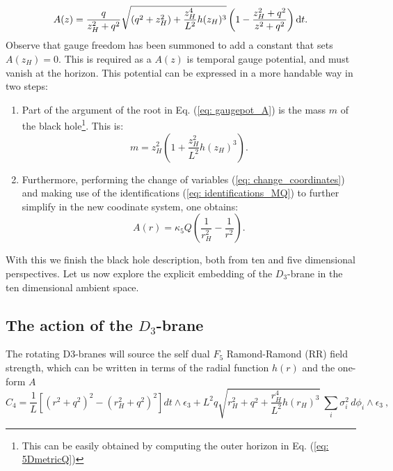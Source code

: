 \begin{equation}\label{eq: gaugepot_A}
 A(z) = \frac{q}{z_H^2+q^2}\sqrt{ \left(q^2+z_H^2 \right) + \frac{z_H^4}{L^2} h(z_H)^3} \left(1-\frac{z_H^2+q^2}{z^2+q^2}\right) \text{d} t.
\end{equation}
Observe that gauge freedom has been summoned to add a constant that sets $A(z_H) = 0$. This is required as a $A(z)$ is temporal gauge potential, and must vanish at the horizon. This potential can be expressed in a more handable way in two steps:
\begin{enumerate}
    \item Part of the argument of the root in Eq. (\ref{eq: gaugepot_A}) is the mass $m$ of the black hole\footnote{This can be easily obtained by computing the outer horizon in Eq. (\ref{eq: 5DmetricQ})}. This is:
    \begin{equation}
        m = z_{H}^{2}\left(1 + \frac{z_{H}^{2}}{L^{2}}h(z_{H})^{3}\right).
    \end{equation}
    \item Furthermore, performing the change of variables (\ref{eq: change_coordinates}) and making use of the identifications (\ref{eq: identifications_MQ}) to further simplify in the new coodinate system, one obtains:
    \begin{equation}\label{eq: gaugepot_A_new_coordinates}
        A(r) = \kappa_{5} Q \left(\frac{1}{r_{H}^{2}} - \frac{1}{r^{2}}\right).
    \end{equation}
\end{enumerate}
With this we finish the black hole description, both from ten and five dimensional perspectives. Let us now explore the explicit embedding of the $D_{3}$-brane in the ten dimensional ambient space.

\subsection{The action of the $D_{3}$-brane}
The rotating D3-branes will source the self dual $F_{5}$ Ramond-Ramond (RR) field strength, which can be written in terms of the radial function $h(r)$ and the one-form $A$ %
\begin{equation}
C_4 = \frac{1}{L}\left[(r^2+q^2)^2 - (r_H^2+q^2)^2\right] dt \wedge \epsilon_3 + L^2 q \sqrt{ r_H^2 + q^2 + \frac{r_H^4}{L^2} h(r_H)^3}\ \sum_i \sigma_i^2\, d\phi_i \wedge \epsilon_3 \ , \label{eq:C4}
\end{equation}
